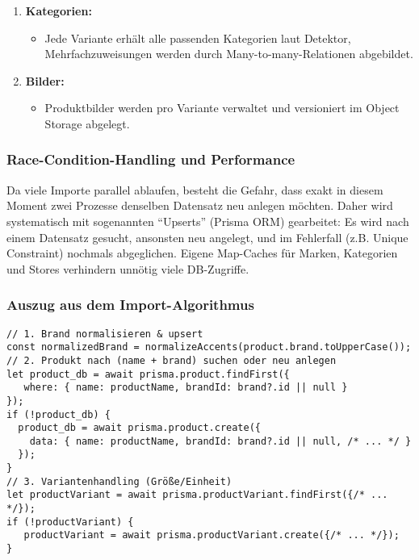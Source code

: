 \documentclass[12pt, a4paper]{report} %
\begin{document}
\begin{enumerate}
    \item \textbf{Kategorien:}
        \begin{itemize}
            \item Jede Variante erhält alle passenden Kategorien laut Detektor, Mehrfachzuweisungen werden durch Many-to-many-Relationen abgebildet.
        \end{itemize}
    \item \textbf{Bilder:}
        \begin{itemize}
            \item Produktbilder werden pro Variante verwaltet und versioniert im Object Storage abgelegt.
        \end{itemize}
\end{enumerate}

\subsubsection{Race-Condition-Handling und Performance}
Da viele Importe parallel ablaufen, besteht die Gefahr, dass exakt in diesem Moment zwei Prozesse denselben Datensatz neu anlegen möchten. Daher wird systematisch mit sogenannten "`Upserts"' (Prisma ORM) gearbeitet: Es wird nach einem Datensatz gesucht, ansonsten neu angelegt, und im Fehlerfall (z.B. Unique Constraint) nochmals abgeglichen. Eigene Map-Caches für Marken, Kategorien und Stores verhindern unnötig viele DB-Zugriffe.

\subsubsection{Auszug aus dem Import-Algorithmus}
\begin{lstlisting}[style=typescriptstyle, caption={Produkt-Import: Algorithmus bei Name-Matching und DB-Schreibvorgang}]
// 1. Brand normalisieren & upsert
const normalizedBrand = normalizeAccents(product.brand.toUpperCase());
// 2. Produkt nach (name + brand) suchen oder neu anlegen
let product_db = await prisma.product.findFirst({
   where: { name: productName, brandId: brand?.id || null }
});
if (!product_db) {
  product_db = await prisma.product.create({
    data: { name: productName, brandId: brand?.id || null, /* ... */ }
  });
}
// 3. Variantenhandling (Größe/Einheit)
let productVariant = await prisma.productVariant.findFirst({/* ... */});
if (!productVariant) {
   productVariant = await prisma.productVariant.create({/* ... */});
}
\end{lstlisting}
\end{document}
